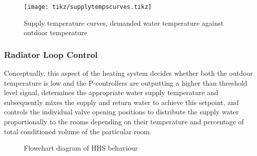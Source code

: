 \begin{figure}[htb]
    \centering
    \texttt{[image: tikz/supplytempscurves.tikz]}
    \caption{Supply temperature curves, demanded water temperature against outdoor temperature}
    \label{fig:supplytempcurves}
\end{figure}



\subsubsection{Radiator Loop Control}
Conceptually, this aspect of the heating system decides whether both the outdoor temperature is low and the P-controllers are outputting a higher than threshold level signal, determines the appropriate water supply temperature and subsequently mixes the supply and return water to achieve this setpoint, and controls the individual valve opening positions to distribute the supply water proportionally to the rooms depending on their temperature and percentage of total conditioned volume of the particular room. 


\begin{figure}[htb]
    \centering
    
    
    \caption{Flowchart diagram of \acs{HHS} behaviour}
    \label{fig:hhsflowchart}
\end{figure}
